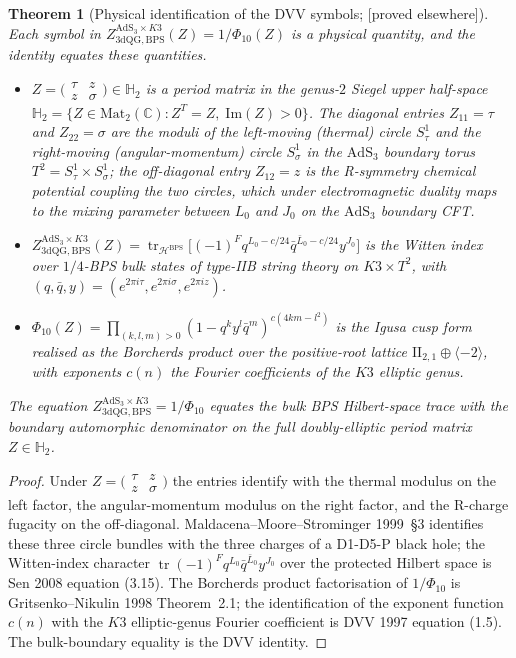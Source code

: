 \documentclass[11pt,reqno]{amsart}
\theoremstyle{plain}
\newtheorem{theorem}{Theorem}[section]
\theoremstyle{definition}
\theoremstyle{remark}
\providecommand{\ClaimStatusProvedElsewhere}{\textnormal{[proved elsewhere]}}
\DeclareMathOperator{\tr}{tr}
\newcommand{\AdS}{\mathrm{AdS}}
\newcommand{\Cbb}{\mathbb{C}}
\newcommand{\Hbb}{\mathbb{H}}
\newcommand{\cH}{\mathcal{H}}
\begin{document}
\begin{theorem}[Physical identification of the DVV symbols; \ClaimStatusProvedElsewhere]
\label{thm:dvv-physics}
Each symbol in $Z^{\AdS_3 \times K3}_{\mathrm{3dQG, BPS}}(Z) = 1/\Phi_{10}(Z)$ is a physical quantity, and the identity equates these quantities.
\begin{itemize}
  \item $Z = \bigl(\begin{smallmatrix} \tau & z \\ z & \sigma \end{smallmatrix}\bigr) \in \Hbb_2$ is a period matrix in the genus-$2$ Siegel upper half-space $\Hbb_2 = \{Z \in \mathrm{Mat}_2(\Cbb) : Z^T = Z,\; \mathrm{Im}(Z) > 0\}$. The diagonal entries $Z_{11} = \tau$ and $Z_{22} = \sigma$ are the moduli of the left-moving (thermal) circle $S^1_\tau$ and the right-moving (angular-momentum) circle $S^1_\sigma$ in the $\AdS_3$ boundary torus $T^2 = S^1_\tau \times S^1_\sigma$; the off-diagonal entry $Z_{12} = z$ is the R-symmetry chemical potential coupling the two circles, which under electromagnetic duality maps to the mixing parameter between $L_0$ and $J_0$ on the $\AdS_3$ boundary CFT.
  \item $Z^{\AdS_3 \times K3}_{\mathrm{3dQG, BPS}}(Z) = \tr_{\cH^{\mathrm{BPS}}}\bigl[(-1)^F q^{L_0 - c/24} \bar q^{\bar L_0 - c/24} y^{J_0}\bigr]$ is the Witten index over $1/4$-BPS bulk states of type-IIB string theory on $K3 \times T^2$, with $(q, \bar q, y) = (e^{2\pi i \tau}, e^{2\pi i \sigma}, e^{2\pi i z})$.
  \item $\Phi_{10}(Z) = \prod_{(k, l, m) > 0} (1 - q^k y^l \bar q^m)^{c(4km - l^2)}$ is the Igusa cusp form realised as the Borcherds product over the positive-root lattice $\mathrm{II}_{2,1} \oplus \langle -2 \rangle$, with exponents $c(n)$ the Fourier coefficients of the $K3$ elliptic genus.
\end{itemize}
The equation $Z^{\AdS_3 \times K3}_{\mathrm{3dQG, BPS}} = 1/\Phi_{10}$ equates the bulk BPS Hilbert-space trace with the boundary automorphic denominator on the full doubly-elliptic period matrix $Z \in \Hbb_2$.
\end{theorem}

\begin{proof}
Under $Z = \bigl(\begin{smallmatrix} \tau & z \\ z & \sigma \end{smallmatrix}\bigr)$ the entries identify with the thermal modulus on the left factor, the angular-momentum modulus on the right factor, and the R-charge fugacity on the off-diagonal. Maldacena--Moore--Strominger 1999~\S3 identifies these three circle bundles with the three charges of a D1-D5-P black hole; the Witten-index character $\tr(-1)^F q^{L_0} \bar q^{\bar L_0} y^{J_0}$ over the protected Hilbert space is Sen 2008 equation (3.15). The Borcherds product factorisation of $1/\Phi_{10}$ is Gritsenko--Nikulin 1998 Theorem~2.1; the identification of the exponent function $c(n)$ with the $K3$ elliptic-genus Fourier coefficient is DVV 1997 equation (1.5). The bulk-boundary equality is the DVV identity.
\end{proof}
\end{document}
